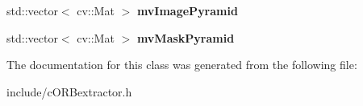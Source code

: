 \begin{DoxyCompactItemize}
\item 
std\+::vector$<$ cv\+::\+Mat $>$ {\bfseries mv\+Image\+Pyramid}\hypertarget{classORBextractor_a764565729bfc43be8adda3283ce57b8e}{}\label{classORBextractor_a764565729bfc43be8adda3283ce57b8e}

\item 
std\+::vector$<$ cv\+::\+Mat $>$ {\bfseries mv\+Mask\+Pyramid}\hypertarget{classORBextractor_ab14e37e8b44afc9f480da3f14dcd0da9}{}\label{classORBextractor_ab14e37e8b44afc9f480da3f14dcd0da9}

\end{DoxyCompactItemize}


The documentation for this class was generated from the following file\+:\begin{DoxyCompactItemize}
\item 
include/c\+O\+R\+Bextractor.\+h\end{DoxyCompactItemize}
